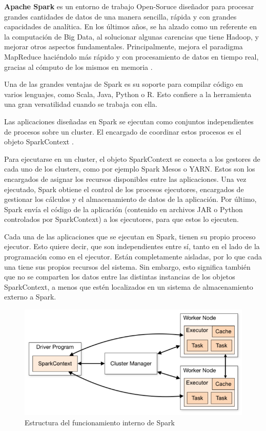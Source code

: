 \textbf{Apache Spark} \cite{SparkInicial} es un entorno de trabajo Open-Soruce diseñador para procesar grandes cantidades de datos de una manera sencilla, rápida y con grandes capacidades de analítica. En los últimos años, se ha alzado como un referente en la computación de Big Data, al solucionar algunas carencias que tiene Hadoop, y mejorar otros aspectos fundamentales. Principalmente, mejora el paradigma MapReduce haciéndolo más rápido y con procesamiento de datos en tiempo real, gracias al cómputo de los mismos en memoria \cite{SparkInicial}.

Una de las grandes ventajas de Spark es su soporte para compilar código en varios lenguajes, como Scala, Java, Python o R. Esto confiere a la herramienta una gran versatilidad cuando se trabaja con ella.

Las aplicaciones diseñadas en Spark se ejecutan como conjuntos independientes de procesos sobre un cluster. El encargado de coordinar estos procesos es el objeto SparkContext \cite{SparkClusterOverview}.

Para ejecutarse en un cluster, el objeto SparkContext se conecta a los gestores de cada uno de los clusters, como por ejemplo Spark Mesos o YARN. Estos son los encargados de asignar los recursos disponibles entre las aplicaciones. Una vez ejecutado, Spark obtiene el control de los procesos ejecutores, encargados de gestionar los cálculos y el almacenamiento de datos de la aplicación. Por último, Spark envía el código de la aplicación (contenido en archivos JAR o Python controlados por SparkContext) a los ejecutores, para que estos lo ejecuten.

Cada una de las aplicaciones que se ejecutan en Spark, tienen su propio proceso ejecutor. Esto quiere decir, que son independientes entre sí, tanto en el lado de la programación como en el ejecutor. Están completamente aisladas, por lo que cada una tiene sus propios recursos del sistema. Sin embargo, esto significa también que no se comparten los datos entre las distintas instancias de los objetos SparkContext, a menos que estén localizados en un sistema de almacenamiento externo a Spark. 

\begin{figure}
	\centering
	\includegraphics[width=1\linewidth]{imagenes/spark_estructura}
	\caption{Estructura del funcionamiento interno de Spark \cite{SparkClusterOverview}}
	\label{fig:sparkestructura}
\end{figure}

